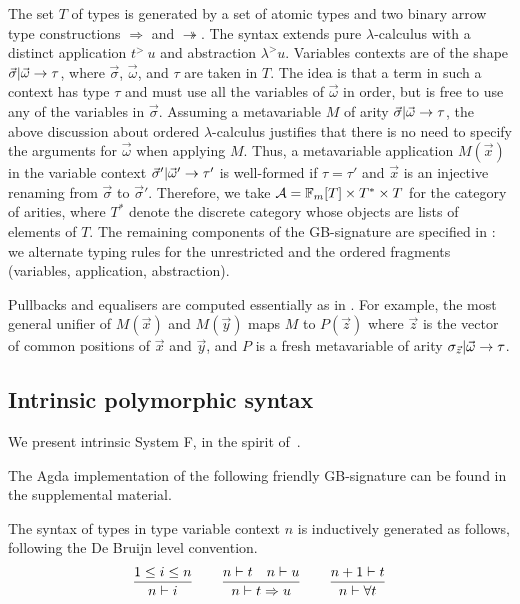 The set $T$ of types is generated by a set of atomic types and two
binary arrow type constructions $\Rightarrow$ and $\twoheadrightarrow$.
The syntax extends pure $\lambda$-calculus with a distinct application
$t^{>}\ u$ and abstraction $\lambda^{>}u$. Variables contexts are
of the shape $\vec{\sigma}\Fsep\vec{\omega}\arSep\tau$, where $\vec{\sigma}$,
$\vec{\omega}$, and $\tau$ are taken in $T$. The idea is that a
term in such a context has type $\tau$ and must use all the variables
of $\vec{\omega}$ in order, but is free to use any of the variables
in $\vec{\sigma}$. Assuming a metavariable $M$ of arity $\vec{\sigma}\Fsep\vec{\omega}\arSep\tau$,
the above discussion about ordered $\lambda$-calculus justifies that
there is no need to specify the arguments for $\vec{\omega}$ when
applying $M$. Thus, a metavariable application $M(\vec{x})$ in the
variable context $\vec{\sigma}'\Fsep\vec{\omega}'\arSep\tau'$ is
well-formed if $\tau=\tau'$ and $\vec{x}$ is an injective renaming
from $\vec{\sigma}$ to $\vec{\sigma}'$. Therefore, we take ${\cal A}=\mathbb{F}_{m}[T]\times T^{*}\times T$
for the category of arities, where $T^{*}$ denote the discrete category
whose objects are lists of elements of $T$. The remaining components
of the GB-signature are specified in : we alternate
typing rules for the unrestricted and the ordered fragments (variables,
application, abstraction).

Pullbacks and equalisers are computed essentially as in .
For example, the most general unifier of $M(\vec{x})$ and $M(\vec{y})$
maps $M$ to $P(\vec{z})$ where $\vec{z}$ is the vector of common
positions of $\vec{x}$ and $\vec{y}$, and $P$ is a fresh metavariable
of arity $\sigma_{\vec{z}}\Fsep\vec{\omega}\arSep\tau$.


\subsection{Intrinsic polymorphic syntax}

\label{subsec:system-F}

We present intrinsic System F, in the spirit of~\citet{HamanaPoly}.
\begin{full}The Agda implementation of the following friendly GB-signature
can be found in the supplemental material.\end{full}

The syntax of types in type variable context $n$ is inductively generated
as follows, following the De Bruijn level convention.
\[
\dfrac{1\leq i\leq n}{n\vdash\var i}\qquad\dfrac{n\vdash t\quad n\vdash u}{n\vdash t\Rightarrow u}\qquad\dfrac{n+1\vdash t}{n\vdash\forall t}
\]

